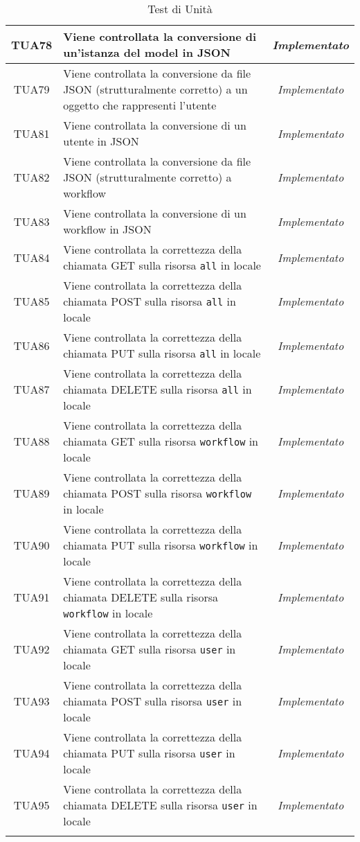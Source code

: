 \begin{longtable}{|c|m{12em}|c|}
TUA78 & Viene controllata la conversione di un'istanza del model in JSON& \textit{Implementato}\\ \hline
TUA79 & Viene controllata la conversione da file JSON (strutturalmente corretto) a un oggetto che rappresenti l'utente& \textit{Implementato}\\ \hline
TUA81 & Viene controllata la conversione di un utente in JSON& \textit{Implementato}\\ \hline
TUA82 & Viene controllata la conversione da file JSON (strutturalmente corretto) a workflow& \textit{Implementato}\\ \hline
TUA83 & Viene controllata la conversione di un workflow in JSON& \textit{Implementato}\\ \hline
TUA84 & Viene controllata la correttezza della chiamata GET sulla risorsa \texttt{all} in locale& \textit{Implementato}\\ \hline
TUA85 & Viene controllata la correttezza della chiamata POST sulla risorsa \texttt{all} in locale& \textit{Implementato}\\ \hline
TUA86 & Viene controllata la correttezza della chiamata PUT sulla risorsa \texttt{all} in locale& \textit{Implementato}\\ \hline
TUA87 & Viene controllata la correttezza della chiamata DELETE sulla risorsa \texttt{all} in locale& \textit{Implementato}\\ \hline
TUA88 & Viene controllata la correttezza della chiamata GET sulla risorsa \texttt{workflow} in locale& \textit{Implementato}\\ \hline
TUA89 & Viene controllata la correttezza della chiamata POST sulla risorsa \texttt{workflow} in locale& \textit{Implementato}\\ \hline
TUA90 & Viene controllata la correttezza della chiamata PUT sulla risorsa \texttt{workflow} in locale& \textit{Implementato}\\ \hline
TUA91 & Viene controllata la correttezza della chiamata DELETE sulla risorsa \texttt{workflow} in locale& \textit{Implementato}\\ \hline
TUA92 & Viene controllata la correttezza della chiamata GET sulla risorsa \texttt{user} in locale& \textit{Implementato}\\ \hline
TUA93 & Viene controllata la correttezza della chiamata POST sulla risorsa \texttt{user} in locale& \textit{Implementato}\\ \hline
TUA94 & Viene controllata la correttezza della chiamata PUT sulla risorsa \texttt{user} in locale& \textit{Implementato}\\ \hline
TUA95 & Viene controllata la correttezza della chiamata DELETE sulla risorsa \texttt{user} in locale& \textit{Implementato}\\ \hline


\caption[Test di Unità]{Test di Unità}
\label{tabella:test2}
\end{longtable}
\clearpage

